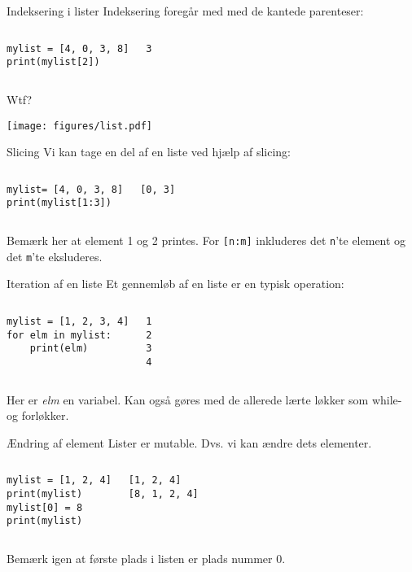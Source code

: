 \begin{frame}[fragile]{Indeksering i lister}
	Indeksering foregår med med de kantede parenteser:
	\begin{columns}
		\begin{lstlisting}[style=python]
mylist = [4, 0, 3, 8]
print(mylist[2])
		\end{lstlisting}
		\pause
		\begin{lstlisting}[style=python]
3
		\end{lstlisting}
	\end{columns}
	Wtf?
	\pause
	\begin{center}
		\texttt{[image: figures/list.pdf]}
	\end{center}

\end{frame}

\begin{frame}[fragile]{Slicing}
	Vi kan tage en del af en liste ved hjælp af slicing:
	\begin{columns}
		\column{0.4\textwidth}
		\begin{lstlisting}[style=python]
mylist= [4, 0, 3, 8]
print(mylist[1:3])
		\end{lstlisting}
		\pause
		\column{0.4\textwidth}
		\begin{lstlisting}[style=python]
[0, 3]
		\end{lstlisting}
	\end{columns}
	Bemærk her at element 1 og 2 printes. For \texttt{[n:m]} inkluderes det \texttt{n}'te element og det \texttt{m}'te eksluderes.
\end{frame}


\begin{frame}[fragile]{Iteration af en liste}
	Et gennemløb af en liste er en typisk operation:
	\begin{columns}
		\begin{lstlisting}[style=python]
mylist = [1, 2, 3, 4]
for elm in mylist:
	print(elm)
		\end{lstlisting}
		\begin{lstlisting}[style=python]
1
2
3
4
		\end{lstlisting}
	\end{columns}
	Her er \emph{elm} en variabel. Kan også gøres med de allerede lærte løkker som while- og forløkker.
\end{frame}

\begin{frame}[fragile]{Ændring af element}
	Lister er mutable. Dvs. vi kan ændre dets elementer.
	\begin{columns}
		\column{0.4\textwidth}
		\begin{lstlisting}[style=python]
mylist = [1, 2, 4]
print(mylist)
mylist[0] = 8
print(mylist)
		\end{lstlisting}
		\column{0.4\textwidth}
		\begin{lstlisting}[style=python]
[1, 2, 4]
[8, 1, 2, 4]
		\end{lstlisting}
	\end{columns}
	Bemærk igen at første plads i listen er plads nummer 0.
\end{frame}

